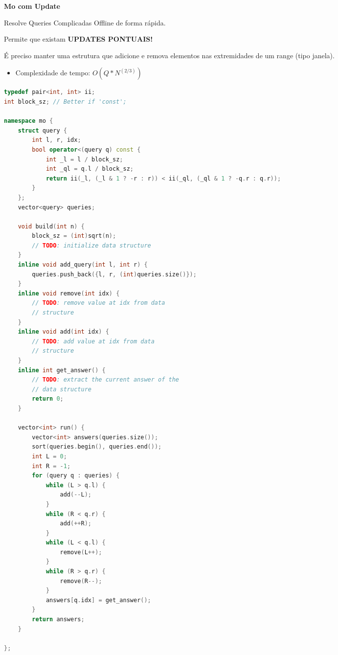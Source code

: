 \documentclass[11pt, a4paper, oneside]{book}
\begin{document}
\textbf{Mo com Update} 



Resolve Queries Complicadas Offline de forma rápida.   

Permite que existam \textbf{UPDATES PONTUAIS!}  

É preciso manter uma estrutura que adicione e remova elementos nas extremidades de um range (tipo janela).



\begin{itemize}
\item Complexidade de tempo: $O(Q * N^(2/3))$
\end{itemize}

\hfill

\begin{multicols}{2}
\begin{lstlisting}[language=C++]
typedef pair<int, int> ii;
int block_sz; // Better if 'const';

namespace mo {
    struct query {
        int l, r, idx;
        bool operator<(query q) const {
            int _l = l / block_sz;
            int _ql = q.l / block_sz;
            return ii(_l, (_l & 1 ? -r : r)) < ii(_ql, (_ql & 1 ? -q.r : q.r));
        }
    };
    vector<query> queries;

    void build(int n) {
        block_sz = (int)sqrt(n);
        // TODO: initialize data structure
    }
    inline void add_query(int l, int r) {
        queries.push_back({l, r, (int)queries.size()});
    }
    inline void remove(int idx) {
        // TODO: remove value at idx from data
        // structure
    }
    inline void add(int idx) {
        // TODO: add value at idx from data
        // structure
    }
    inline int get_answer() {
        // TODO: extract the current answer of the
        // data structure
        return 0;
    }

    vector<int> run() {
        vector<int> answers(queries.size());
        sort(queries.begin(), queries.end());
        int L = 0;
        int R = -1;
        for (query q : queries) {
            while (L > q.l) {
                add(--L);
            }
            while (R < q.r) {
                add(++R);
            }
            while (L < q.l) {
                remove(L++);
            }
            while (R > q.r) {
                remove(R--);
            }
            answers[q.idx] = get_answer();
        }
        return answers;
    }

};
\end{lstlisting}
\end{multicols}
\end{document}
